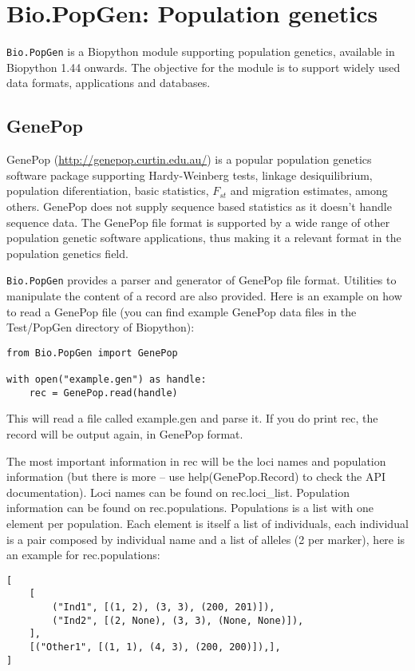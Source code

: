 \chapter{Bio.PopGen: Population genetics}
\label{chapter:popgen}

\verb|Bio.PopGen| is a Biopython module supporting population genetics,
available in Biopython 1.44 onwards. The objective for the module is to
support widely used data formats, applications and databases.

\section{GenePop}

GenePop (\url{http://genepop.curtin.edu.au/}) is a popular population
genetics software package supporting Hardy-Weinberg tests, linkage
desiquilibrium, population diferentiation, basic statistics, $F_{st}$ and
migration estimates, among others. GenePop does not supply sequence
based statistics as it doesn't handle sequence data.
The GenePop file format is supported by a wide range of other population
genetic software applications, thus making it a relevant format in the
population genetics field.

\verb|Bio.PopGen| provides a parser and generator of GenePop file format.
Utilities to manipulate the content of a record are also provided.
Here is an example on how to read a GenePop file (you can find
example GenePop data files in the Test/PopGen directory of Biopython):

\begin{verbatim}
from Bio.PopGen import GenePop

with open("example.gen") as handle:
    rec = GenePop.read(handle)
\end{verbatim}

This will read a file called example.gen and parse it. If you
do print rec, the record will be output again, in GenePop format.

The most important information in rec will be the loci names and
population information (but there is more -- use help(GenePop.Record)
to check the API documentation). Loci names can be found on rec.loci\_list.
Population information can be found on rec.populations.
Populations is a list with one element per population. Each element is itself
a list of individuals, each individual is a pair composed by individual
name and a list of alleles (2 per marker), here is an example for
rec.populations:

\begin{verbatim}
[
    [
        ("Ind1", [(1, 2), (3, 3), (200, 201)]),
        ("Ind2", [(2, None), (3, 3), (None, None)]),
    ],
    [("Other1", [(1, 1), (4, 3), (200, 200)]),],
]
\end{verbatim}

